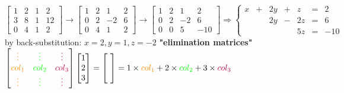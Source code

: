 \documentclass[12pt, a4paper]{article}
\begin{document}
\begin{math}
	\left[
	\begin{array}{ccc|c}
		1 & 2 & 1 & 2 \\
		3 & 8 & 1 & 12 \\
		0 & 4 & 1 & 2
	\end{array}
	\right]
	\longrightarrow
	\left[
	\begin{array}{ccc|c}
		1 & 2 & 1 & 2 \\
		0 & 2 & -2 & 6 \\
		0 & 4 & 1 & 2
	\end{array}
	\right]
	\longrightarrow
	\left[
	\begin{array}{ccc|c}
		1 & 2 & 1 & 2 \\
		0 & 2 & -2 & 6 \\
		0 & 0 & 5 & -10
	\end{array}
	\right]
	\Rightarrow
	\left\{  
	\begin{array}{rclrclrcl}
		x & + & 2y & + & z  & = & 2 \\
		  &   & 2y & - & 2z & = & 6  \\
		  &   &    &   & 5z & = & -10  
	\end{array}  
	\right.
\end{math}
\newline
by back-substitution: 
\begin{math}
	x = 2, y = 1, z = -2
\end{math}
\vspace{14pt}
\newline
{\bf{"elimination matrices"}}
\vspace{14pt}
\newline
\begin{math}
	\begin{bmatrix}
		{\textcolor{anhao-orange}{\vdots}} & {\textcolor{green}{\vdots}} & {\textcolor{purple}{\vdots}} \\
		{\textcolor{anhao-orange}{col_1}} & {\textcolor{green}{col_2}} & {\textcolor{purple}{col_3}} \\
		{\textcolor{anhao-orange}{\vdots}} & {\textcolor{green}{\vdots}} & {\textcolor{purple}{\vdots}}
	\end{bmatrix}
	\begin{bmatrix}
		1 \\
		2 \\
		3
	\end{bmatrix}
	 = 
	\begin{bmatrix}
		\ \\
		\ \\
		\ 
	\end{bmatrix}
	 = 
	1 \times {\textcolor{anhao-orange}{col_1}} + 2 \times {\textcolor{green}{col_2}} + 3 \times {\textcolor{purple}{col_3}}
\end{math}
\end{document}
